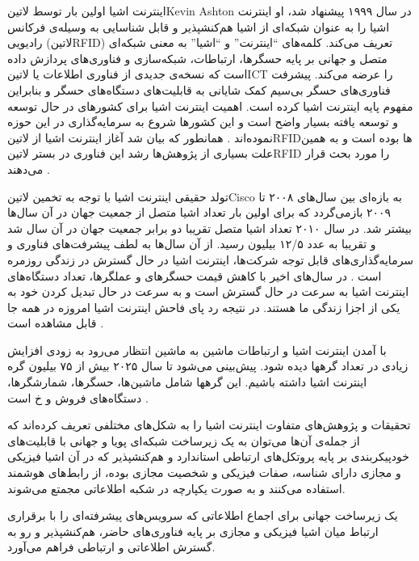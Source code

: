 
اینترنت اشیا اولین بار توسط ‌لاتین{Kevin Ashton} در سال ۱۹۹۹ پیشنهاد شد، او اینترنت اشیا را به عنوان
شبکه‌ای از اشیا هم‌کنشپذیر و قابل شناسایی به وسیله‌ی فرکانس رادیویی (‌لاتین{RFID}) تعریف می‌کند.
کلمه‌های ``اینترنت'' و ``اشیا'' به معنی شبکه‌ای متصل و جهانی بر پایه حسگرها، ارتباطات، شبکه‌سازی و فناوری‌های پردازش داده است
که نسخه‌ی جدیدی از فناوری اطلاعات یا ‌لاتین{ICT} را عرضه می‌کند.
پیشرفت فناوری‌های حسگر بی‌سیم کمک شایانی به قابلیت‌های دستگاه‌های حسگر و بنابراین مفهوم پایه اینترنت اشیا کرده است.
اهمیت اینترنت اشیا برای کشورهای در حال توسعه و توسعه یافته بسیار واضح است و این کشورها شروع به سرمایه‌گذاری در این حوزه نموده‌اند
.
همانطور که بیان شد آغاز اینترنت اشیا از ‌لاتین{RFID}ها بوده است و به همین علت بسیاری از پژوهش‌ها رشد این فناوری
در بستر ‌لاتین{RFID} را مورد بحث قرار می‌دهند
.

تولد حقیقی اینترنت اشیا با توجه به تخمین ‌لاتین{Cisco} به بازه‌ای بین سال‌های ۲۰۰۸ تا ۲۰۰۹ بازمی‌گردد که برای اولین بار تعداد اشیا
متصل از جمعیت جهان در آن سال‌ها بیشتر شد. در سال ۲۰۱۰ تعداد اشیا متصل تقریبا دو برابر جمعیت جهان در آن سال شد و تقریبا به عدد ۱۲/۵ بیلیون رسید.
از آن سال‌ها به لطف پیشرفت‌های فناوری و سرمایه‌گذاری‌های قابل توجه شرکت‌ها، اینترنت اشیا در حال گسترش در زندگی روزمره است
.
در سال‌های اخیر با کاهش قیمت حسگرهای و عملگرها، تعداد دستگاه‌های اینترنت اشیا به سرعت در حال گسترش است و به سرعت در حال تبدیل کردن خود به یکی از اجزا زندگی ما هستند.
در نتیجه رد پای فاحش اینترنت اشیا امروزه در همه جا قابل مشاهده است
.

با آمدن اینترنت اشیا و ارتباطات ماشین به ماشین انتظار می‌رود به زودی افزایش زیادی در تعداد گرهها دیده شود. پیش‌بینی می‌شود تا سال ۲۰۲۵ بیش از ۷۵ بیلیون گره اینترنت اشیا داشته باشیم.
این گرهها شامل ماشین‌ها، حسگرها، شمارشگرها، دستگاه‌های فروش و ‌خ است .

تحقیقات و پژوهش‌های متفاوت اینترنت اشیا را به شکل‌های مختلفی تعریف کرده‌اند که از جمله‌ی آن‌ها می‌توان به
یک زیرساخت شبکه‌ای پویا و جهانی با قابلیت‌های خودپیکربندی بر پایه پروتکل‌های ارتباطی استاندارد و هم‌کنشپذیر که در آن اشیا فیزیکی و مجازی دارای شناسه، صفات فیزیکی
و شخصیت مجازی بوده، از رابط‌های هوشمند استفاده می‌کنند و به صورت یکپارچه در شکبه اطلاعاتی مجمتع می‌شوند.

یک زیرساخت جهانی برای اجماع اطلاعاتی که سرویس‌های پیشرفته‌ای را با برقراری ارتباط میان اشیا فیزیکی و مجازی بر پایه فناوری‌های حاضر، هم‌کنشپذیر و رو به گسترش اطلاعاتی
و ارتباطی فراهم می‌آورد.

